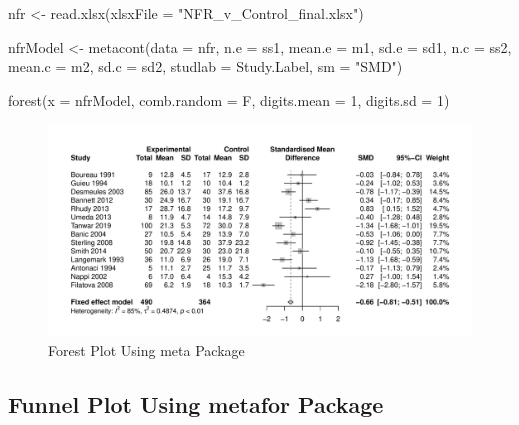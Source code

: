 \documentclass[
  11pt,
]{article}
\newenvironment{Shaded}{\begin{snugshade}}{\end{snugshade}}
\newcommand{\AttributeTok}[1]{\textcolor[rgb]{0.77,0.63,0.00}{#1}}
\newcommand{\DecValTok}[1]{\textcolor[rgb]{0.00,0.00,0.81}{#1}}
\newcommand{\FunctionTok}[1]{\textcolor[rgb]{0.00,0.00,0.00}{#1}}
\newcommand{\NormalTok}[1]{#1}
\newcommand{\OtherTok}[1]{\textcolor[rgb]{0.56,0.35,0.01}{#1}}
\newcommand{\StringTok}[1]{\textcolor[rgb]{0.31,0.60,0.02}{#1}}
\begin{document}
\begin{Shaded}
\begin{Highlighting}[]
\NormalTok{nfr }\OtherTok{\textless{}{-}} \FunctionTok{read.xlsx}\NormalTok{(}\AttributeTok{xlsxFile =} \StringTok{"NFR\_v\_Control\_final.xlsx"}\NormalTok{)}

\NormalTok{nfrModel }\OtherTok{\textless{}{-}} \FunctionTok{metacont}\NormalTok{(}\AttributeTok{data =}\NormalTok{ nfr, }\AttributeTok{n.e =}\NormalTok{ ss1, }\AttributeTok{mean.e =}\NormalTok{ m1, }\AttributeTok{sd.e =}\NormalTok{ sd1,}
    \AttributeTok{n.c =}\NormalTok{ ss2, }\AttributeTok{mean.c =}\NormalTok{ m2, }\AttributeTok{sd.c =}\NormalTok{ sd2, }\AttributeTok{studlab =}\NormalTok{ Study.Label,}
    \AttributeTok{sm =} \StringTok{"SMD"}\NormalTok{)}

\FunctionTok{forest}\NormalTok{(}\AttributeTok{x =}\NormalTok{ nfrModel, }\AttributeTok{comb.random =}\NormalTok{ F, }\AttributeTok{digits.mean =} \DecValTok{1}\NormalTok{, }\AttributeTok{digits.sd =} \DecValTok{1}\NormalTok{)}
\end{Highlighting}
\end{Shaded}

\begin{figure}

{\centering \includegraphics{IntroToMA_pdf_files/figure-latex/unnamed-chunk-1-1} 

}

\caption{Forest Plot Using meta Package}\label{fig:unnamed-chunk-1}
\end{figure}

\hypertarget{funnel-plot-using-metafor-package}{%
\subsection{Funnel Plot Using metafor Package}\label{funnel-plot-using-metafor-package}}
\end{document}
